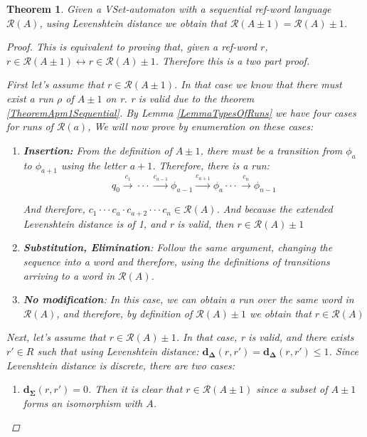 \documentclass{article}
\newcommand{\trans}[1]{\overset{#1}{\longrightarrow}}
\newtheorem{theorem}{Theorem}
\begin{document}
\begin{theorem} \label{TheoremAutomatonPM1}
    Given a VSet-automaton with a sequential ref-word language
    $\mathcal{R}(A)$, using Levenshtein distance we obtain that
    $\mathcal{R}(A \pm 1) = \mathcal{R}(A) \pm 1$.

    \begin{proof}
	This is equivalent to proving that, given a ref-word $r$,
	$r \in \mathcal{R}(A \pm 1) \leftrightarrow r \in
	\mathcal{R}(A)\pm 1$. Therefore this is a two part proof.

	First let's assume that $r \in \mathcal{R}(A \pm 1)$. In
	that case we know that there must exist a run $\rho$ of $A
    \pm 1$ on r. r is valid due to the theorem \ref{TheoremApm1Sequential}.
        By Lemma \ref{LemmaTypesOfRuns} we have four cases for runs of $\mathcal{R}(a)$, We will now prove by enumeration on these cases:
    \begin{enumerate}
        \item \textbf{Insertion:} From the definition of $A \pm 1$, there must be a transition from $\phi_a$ to $\phi_{a+1}$ using the letter $a + 1$. Therefore, there is a run:
        \begin{equation*}
            q_0 \trans{c_1} \cdot\cdot\cdot\trans{c_{a-1}}\phi_{a-1} \trans{c_{a+1}} \phi_{a} \cdot\cdot\cdot \trans{c_n} \phi_{n - 1}
        \end{equation*}

	    And therefore, $c_1 \cdot\cdot\cdot c_a \cdot c_{a+2}
	    \cdot\cdot\cdot c_n \in \mathcal{R}(A)$. And because
	    the extended Levenshtein distance is of 1, and r is
	    valid, then $r \in \mathcal{R}(A) \pm 1$
            
    \item \textbf{Substitution, Elimination}: Follow the same argument, changing the sequence into a word and therefore, using the definitions of transitions arriving to a word in $\mathcal{R}(A)$.
        \item \textbf{No modification}: In this case, we can obtain a run over the same word
            in $\mathcal{R}(A)$, and therefore, by definition of $\mathcal{R}(A)
            \pm 1$ we obtain that $r \in \mathcal{R}(A)$
	    \end{enumerate}



        Next, let's assume that $r \in \mathcal{R}(A) \pm 1$. In that case, r is valid, and there exists $r' \in R$ such that using Levenshtein distance: $\mathbf{d_\Delta}(r, r') = \mathbf{d_\Delta}(r, r') \leq 1$. Since Levenshtein distance is discrete, there are two cases:
        \begin{enumerate}
            \item $\mathbf{d_\Sigma}(r, r') = 0$. Then it is clear
            that $r \in \mathcal{R}(A \pm 1)$ since a subset of $A
            \pm 1$ forms an isomorphism with $A$.


\end{enumerate}
\end{proof}
\end{theorem}
\end{document}
